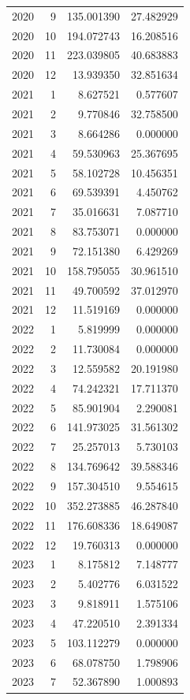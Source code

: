 \begin{tabular}{rrrr}
2020 & 9 & 135.001390 & 27.482929 \\
2020 & 10 & 194.072743 & 16.208516 \\
2020 & 11 & 223.039805 & 40.683883 \\
2020 & 12 & 13.939350 & 32.851634 \\
2021 & 1 & 8.627521 & 0.577607 \\
2021 & 2 & 9.770846 & 32.758500 \\
2021 & 3 & 8.664286 & 0.000000 \\
2021 & 4 & 59.530963 & 25.367695 \\
2021 & 5 & 58.102728 & 10.456351 \\
2021 & 6 & 69.539391 & 4.450762 \\
2021 & 7 & 35.016631 & 7.087710 \\
2021 & 8 & 83.753071 & 0.000000 \\
2021 & 9 & 72.151380 & 6.429269 \\
2021 & 10 & 158.795055 & 30.961510 \\
2021 & 11 & 49.700592 & 37.012970 \\
2021 & 12 & 11.519169 & 0.000000 \\
2022 & 1 & 5.819999 & 0.000000 \\
2022 & 2 & 11.730084 & 0.000000 \\
2022 & 3 & 12.559582 & 20.191980 \\
2022 & 4 & 74.242321 & 17.711370 \\
2022 & 5 & 85.901904 & 2.290081 \\
2022 & 6 & 141.973025 & 31.561302 \\
2022 & 7 & 25.257013 & 5.730103 \\
2022 & 8 & 134.769642 & 39.588346 \\
2022 & 9 & 157.304510 & 9.554615 \\
2022 & 10 & 352.273885 & 46.287840 \\
2022 & 11 & 176.608336 & 18.649087 \\
2022 & 12 & 19.760313 & 0.000000 \\
2023 & 1 & 8.175812 & 7.148777 \\
2023 & 2 & 5.402776 & 6.031522 \\
2023 & 3 & 9.818911 & 1.575106 \\
2023 & 4 & 47.220510 & 2.391334 \\
2023 & 5 & 103.112279 & 0.000000 \\
2023 & 6 & 68.078750 & 1.798906 \\
2023 & 7 & 52.367890 & 1.000893 \\

\end{tabular}
